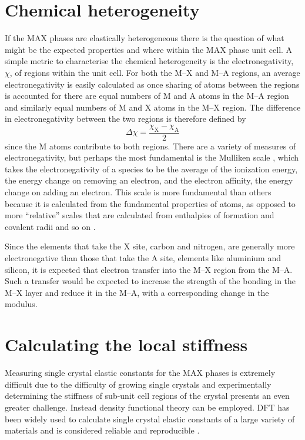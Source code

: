 \section{Chemical heterogeneity}


If the MAX phases are elastically heterogeneous there is the question of what might be the expected properties and where within the MAX phase unit cell. A simple metric to characterise the chemical heterogeneity is the electronegativity, $\chi$, of regions within the unit cell. For both the M--X and M--A regions, an average electronegativity is easily calculated as once sharing of atoms between the regions is accounted for there are equal numbers of M and A atoms in the M--A region and similarly equal numbers of M and X atoms in the M--X region. The difference in electronegativity between the two regions is therefore defined by
\begin{equation}
\Delta \chi = \frac{\chi_{\text{X}} - \chi_{\text{A}}}{2}\label{eqn:MAX_electronegativity_diff}
\end{equation}
since the M atoms contribute to both regions. There are a variety of measures of electronegativity, but perhaps the most fundamental is the Mulliken scale \cite{Mulliken1934}, which takes the electronegativity of a species to be the average of the ionization energy, the energy change on removing an electron, and the electron affinity, the energy change on adding an electron. This scale is more fundamental than others because it is calculated from the fundamental properties of atoms, as opposed to more ``relative'' scales that are calculated from enthalpies of formation and covalent radii and so on \cite{huheey1983ch3_electronegativity}.

Since the elements that take the X site, carbon and nitrogen, are generally more electronegative than those that take the A site, elements like aluminium and silicon, it is expected that electron transfer into the M--X region from the M--A. Such a transfer would be expected to increase the strength of the bonding in the M--X layer and reduce it in the M--A, with a corresponding change in the modulus.

\section{Calculating the local stiffness}

Measuring single crystal elastic constants for the MAX phases is extremely difficult due to the difficulty of growing single crystals and experimentally determining the stiffness of sub-unit cell regions of the crystal presents an even greater challenge. Instead density functional theory can be employed. DFT has been widely used to calculate single crystal elastic constants of a large variety of materials and is considered reliable and reproducible \cite{Lejaeghere2016}. 


